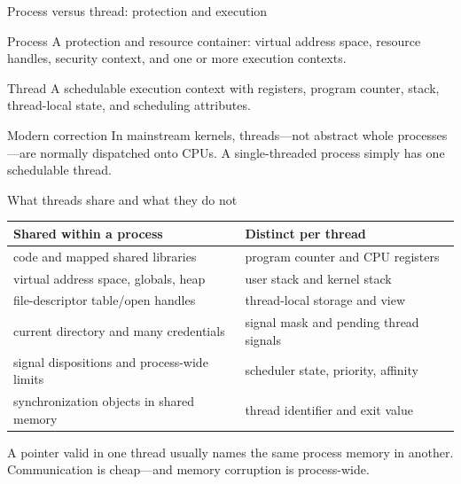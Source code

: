 \documentclass[aspectratio=169,11pt]{beamer}
\newcommand{\code}[1]{\texttt{\detokenize{#1}}}
\begin{document}
\begin{frame}{Process versus thread: protection and execution}
  \begin{block}{Process}
    A protection and resource container: virtual address space, resource handles, security context, and one or more execution contexts.
  \end{block}
  \begin{block}{Thread}
    A schedulable execution context with registers, program counter, stack, thread-local state, and scheduling attributes.
  \end{block}
  \begin{alertblock}{Modern correction}
    In mainstream kernels, threads---not abstract whole processes---are normally dispatched onto CPUs. A single-threaded process simply has one schedulable thread.
  \end{alertblock}
\end{frame}

\begin{frame}{What threads share and what they do not}
  \small
  \begin{tabularx}{\textwidth}{@{}XX@{}}
    \toprule
    \textbf{Shared within a process} & \textbf{Distinct per thread} \\
    \midrule
    code and mapped shared libraries & program counter and CPU registers \\
    virtual address space, globals, heap & user stack and kernel stack \\
    file-descriptor table/open handles & thread-local storage and \code{errno} view \\
    current directory and many credentials & signal mask and pending thread signals \\
    signal dispositions and process-wide limits & scheduler state, priority, affinity \\
    synchronization objects in shared memory & thread identifier and exit value \\
    \bottomrule
  \end{tabularx}
  \begin{tcolorbox}[title=Consequence,colback=osred!4,colframe=osred!65]
    A pointer valid in one thread usually names the same process memory in another. Communication is cheap---and memory corruption is process-wide.
  \end{tcolorbox}
\end{frame}
\end{document}

